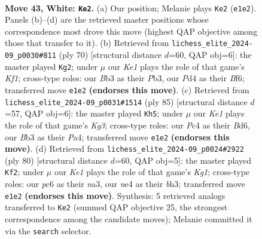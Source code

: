\documentclass[11pt]{article}
\begin{document}
\clearpage

\begin{figure}[p]\centering
\begin{subfigure}{0.46\textwidth}\centering
\resizebox{\linewidth}{!}{%
\newchessgame
\chessboard[
  setfen={r1b5/p2p2k1/1pp5/5p1p/1PPPnP2/NB6/P6P/2R1K3 w - - 3 43},
  showmover=false,
  pgfstyle=straightmove, color=movearrow, markmove={e1-e2}
]}
\caption{}
\end{subfigure}\hfill
\begin{subfigure}{0.46\textwidth}\centering
\resizebox{\linewidth}{!}{%
\newchessgame
\chessboard[
  setfen={2k1rb2/p7/1pp2Bp1/5p1p/2P4P/1P4P1/P4P2/3R1K2 w - - 0 36},
  showmover=false,
  pgfstyle=straightmove, color=movearrow, markmove={f1-g2}
]}
\caption{}
\end{subfigure}
\\[4pt]
\begin{subfigure}{0.46\textwidth}\centering
\resizebox{\linewidth}{!}{%
\newchessgame
\chessboard[
  setfen={6r1/2p2p2/3b2k1/3P1p2/pp1B1P2/3K2PP/PP6/7R b - - 1 43},
  showmover=false,
  pgfstyle=straightmove, color=movearrow, markmove={g6-h5}
]}
\caption{}
\end{subfigure}\hfill
\begin{subfigure}{0.46\textwidth}\centering
\resizebox{\linewidth}{!}{%
\newchessgame
\chessboard[
  setfen={8/4r1kp/1NR3p1/p3pp2/P7/n3PPPb/3N3P/6K1 w - - 1 41},
  showmover=false,
  pgfstyle=straightmove, color=movearrow, markmove={g1-f2}
]}
\caption{}
\end{subfigure}
\caption{\textbf{Move 43, White: \texttt{Ke2}.} (a) Our position; Melanie plays \texttt{Ke2} (\texttt{e1e2}). Panels (b)--(d) are the retrieved master positions whose correspondence most drove this move (highest QAP objective among those that transfer to it). (b) Retrieved from \texttt{lichess\_elite\_2024-09\_p0030\#811} (ply 70) [structural distance $d$=60, QAP obj=6]: the master played \texttt{Kg2}; under $\mu$ our \emph{Ke1} plays the role of that game's \emph{Kf1}; cross-type roles: our \emph{B}b3 as their \emph{P}b3, our \emph{P}d4 as their \emph{B}f6; transferred move \texttt{e1e2} \textbf{(endorses this move)}. (c) Retrieved from \texttt{lichess\_elite\_2024-09\_p0031\#1514} (ply 85) [structural distance $d$=57, QAP obj=6]: the master played \texttt{Kh5}; under $\mu$ our \emph{Ke1} plays the role of that game's \emph{Kg3}; cross-type roles: our \emph{P}c4 as their \emph{B}d6, our \emph{B}b3 as their \emph{P}a4; transferred move \texttt{e1e2} \textbf{(endorses this move)}. (d) Retrieved from \texttt{lichess\_elite\_2024-09\_p0024\#2922} (ply 80) [structural distance $d$=60, QAP obj=5]: the master played \texttt{Kf2}; under $\mu$ our \emph{Ke1} plays the role of that game's \emph{Kg1}; cross-type roles: our \emph{p}c6 as their \emph{n}a3, our \emph{n}e4 as their \emph{b}h3; transferred move \texttt{e1e2} \textbf{(endorses this move)}. Synthesis: 5 retrieved analogs transferred to \texttt{Ke2} (summed QAP objective 25, the strongest correspondence among the candidate moves); Melanie committed it via the \texttt{search} selector.}
\label{fig:thought-m84}
\end{figure}
\end{document}
